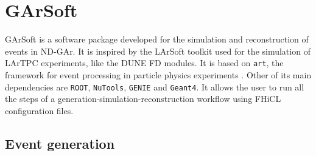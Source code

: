 \section{GArSoft}\label{section:garsoft}

GArSoft is a software package developed for the simulation and reconstruction of events in ND-GAr. It is inspired by the LArSoft toolkit used for the simulation of LArTPC experiments, like the DUNE FD modules. It is based on \texttt{art}, the framework for event processing in particle physics experiments \cite{ART}. Other of its main dependencies are \texttt{ROOT}, \texttt{NuTools}, \texttt{GENIE} and \texttt{Geant4}. It allows the user to run all the steps of a generation-simulation-reconstruction workflow using FHiCL configuration files.

\subsection{Event generation}

